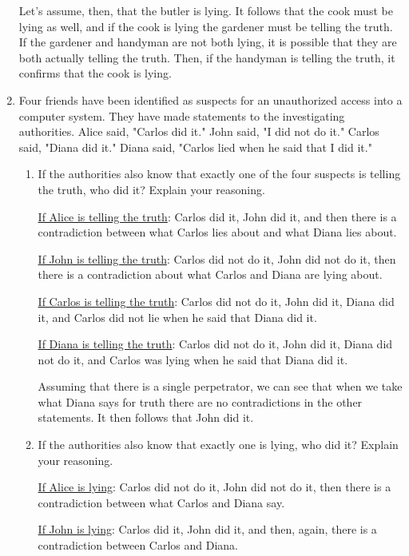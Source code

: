 \documentclass[11pt]{article}
\begin{document}
\begin{enumerate}[label=\textbf{\arabic*.}]
	Let's assume, then, that the butler is lying. It follows that the cook must be lying as well, and if the cook is lying the gardener must be telling the truth. If the gardener and handyman are not both lying, it is possible that they are both actually telling the truth. Then, if the handyman is telling the truth, it confirms that the cook is lying.
	
	\item Four friends have been identified as suspects for an unauthorized access into a computer system. They have made statements to the investigating authorities. Alice said, "Carlos did it." John said, "I did not do it." Carlos said, "Diana did it." Diana said, "Carlos lied when he said that I did it."
	
	\begin{enumerate}[label=\textbf{\alph*)}]
		\item If the authorities also know that exactly one of the four suspects is telling the truth, who did it? Explain your reasoning.
		
		\underline{If Alice is telling the truth}: Carlos did it, John did it, and then there is a contradiction between what Carlos lies about and what Diana lies about.
		
		\underline{If John is telling the truth}: Carlos did not do it, John did not do it, then there is a contradiction about what Carlos and Diana are lying about.
		
		\underline{If Carlos is telling the truth}: Carlos did not do it, John did it, Diana did it, and Carlos did not lie when he said that Diana did it.
		
		\underline{If Diana is telling the truth}: Carlos did not do it, John did it, Diana did not do it, and Carlos was lying when he said that Diana did it.
		
		Assuming that there is a single perpetrator, we can see that when we take what Diana says for truth there are no contradictions in the other statements. It then follows that John did it.
		
		\item If the authorities also know that exactly one is lying, who did it? Explain your reasoning.
		
		\underline{If Alice is lying}: Carlos did not do it, John did not do it, then there is a contradiction between what Carlos and Diana say.
		
		\underline{If John is lying}: Carlos did it, John did it, and then, again, there is a contradiction between Carlos and Diana.
		

\end{enumerate}
\end{enumerate}
\end{document}
